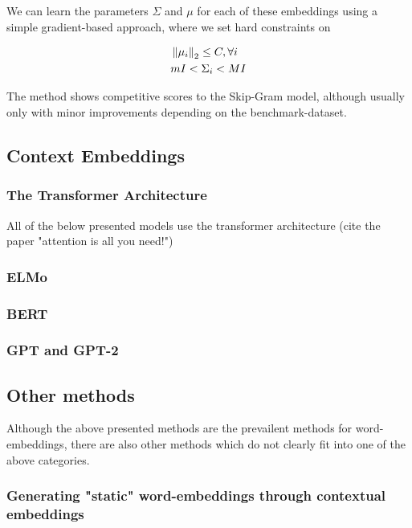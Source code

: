 \documentclass[a4paper,12pt,twoside,openright]{report}
\begin{document}
We can learn the parameters $\Sigma$ and $\mu$ for each of these embeddings using a simple gradient-based approach, where we set hard constraints on 

\begin{align}
& \left\lVert \mu_i \right\rVert_2  \leq C, \forall i \\
& m I <  \Sigma_i < M I
\end{align}

The method shows competitive scores to the Skip-Gram model, although usually only with minor improvements depending on the benchmark-dataset.


\subsection{Context Embeddings}

\subsubsection{The Transformer Architecture}

All of the below presented models use the transformer architecture (cite the paper "attention is all you need!")

\subsubsection{ELMo}

\subsubsection{BERT}

\subsubsection{GPT and GPT-2}



\subsection{Other methods}

Although the above presented methods are the prevailent methods for word-embeddings, there are also other methods which do not clearly fit into one of the above categories.

\subsubsection{Generating "static" word-embeddings through contextual embeddings}
\end{document}
